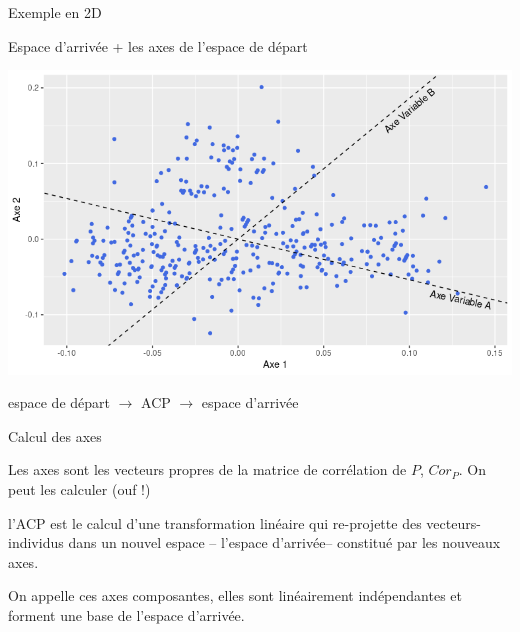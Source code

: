\documentclass{beamer}
\begin{document}
\begin{frame}{Exemple en 2D}

Espace d'arrivée + les axes de l'espace de départ

\centering
\includegraphics[width=\textwidth,keepaspectratio]{img/exemple_2D_arrivee_axes.png}

\end{frame}




\begin{frame}


espace de départ $\rightarrow$ ACP $\rightarrow$ espace d'arrivée 

\end{frame}




\begin{frame}{Calcul des axes}

Les \alert{axes} sont les \alert{vecteurs propres} de la matrice de corrélation de $P$, $Cor_P$. 
On peut les calculer (ouf !)

\medskip

l'ACP est le calcul d’une transformation linéaire qui \alert{re-projette} des vecteurs-individus dans un nouvel \alert{espace} -- l'espace d'arrivée--  constitué par les \alert{nouveaux axes}.

\medskip

On appelle ces axes \alert{composantes}, elles sont \alert{linéairement indépendantes} et forment une \alert{base} de l'espace d'arrivée.
\end{frame}
\end{document}
